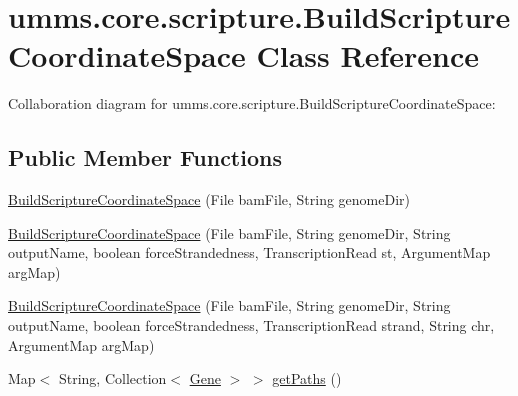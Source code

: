 \hypertarget{classumms_1_1core_1_1scripture_1_1_build_scripture_coordinate_space}{\section{umms.\+core.\+scripture.\+Build\+Scripture\+Coordinate\+Space Class Reference}
\label{classumms_1_1core_1_1scripture_1_1_build_scripture_coordinate_space}
}


Collaboration diagram for umms.\+core.\+scripture.\+Build\+Scripture\+Coordinate\+Space\+:
\subsection*{Public Member Functions}
\begin{DoxyCompactItemize}
\item 
\hyperlink{classumms_1_1core_1_1scripture_1_1_build_scripture_coordinate_space_ad26f342f5ff559673f1737a16e41f4f1}{Build\+Scripture\+Coordinate\+Space} (File bam\+File, String genome\+Dir)
\item 
\hyperlink{classumms_1_1core_1_1scripture_1_1_build_scripture_coordinate_space_a80afa5bcdef6a657c5ef6a1470f97b42}{Build\+Scripture\+Coordinate\+Space} (File bam\+File, String genome\+Dir, String output\+Name, boolean force\+Strandedness, Transcription\+Read st, Argument\+Map arg\+Map)
\item 
\hyperlink{classumms_1_1core_1_1scripture_1_1_build_scripture_coordinate_space_a4379468193a0042db7131f0dec21a81d}{Build\+Scripture\+Coordinate\+Space} (File bam\+File, String genome\+Dir, String output\+Name, boolean force\+Strandedness, Transcription\+Read strand, String chr, Argument\+Map arg\+Map)
\item 
Map$<$ String, Collection$<$ \hyperlink{classumms_1_1core_1_1annotation_1_1_gene}{Gene} $>$ $>$ \hyperlink{classumms_1_1core_1_1scripture_1_1_build_scripture_coordinate_space_a21a8a4ecd7583dba621994b16570f72a}{get\+Paths} ()
\end{DoxyCompactItemize}
